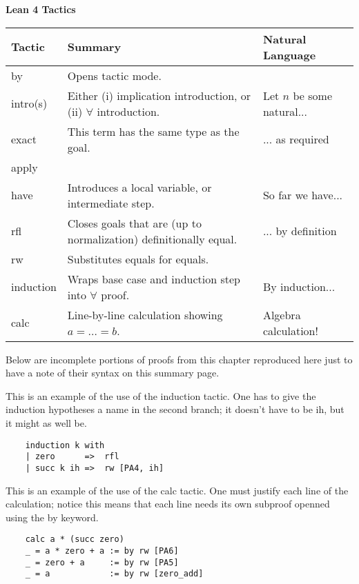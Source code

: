 \documentclass{book}
\begin{document}
\begin{table}[htbp]
    \centering
    \renewcommand{\arraystretch}{1.5}
    \textbf{Lean 4 Tactics}\\
    \vspace{0.2cm}        
    \footnotesize
    \begin{tabular}{|l|l|l|}
    \hline
    \textbf{Tactic} & \textbf{Summary} & \textbf{Natural Language} \\
    \hline
    by & Opens tactic mode. & \\
    intro(s) & Either (i) implication introduction, or (ii) $\forall$ introduction. & Let $n$ be some natural...\\
    exact & This term has the same type as the goal. & ... as required \\
    apply & & \\
    have & Introduces a local variable, or intermediate step. & So far we have... \\
    rfl & Closes goals that are (up to normalization) definitionally equal. & ... by definition \\
    rw & Substitutes equals for equals. & \\
    induction & Wraps base case and induction step into $\forall$ proof. & By induction...\\
    calc & Line-by-line calculation showing $a = \dots = b$. & Algebra calculation!\\
    \hline
    \end{tabular}
\end{table}

Below are incomplete portions of proofs from this chapter reproduced here just to have a note of their syntax on this summary page. 

This is an example of the use of the induction tactic. One has to give the induction hypotheses a name in the second branch; it doesn't have to be ih, but it might as well be. 
\begin{lstlisting}
    induction k with
    | zero      =>  rfl
    | succ k ih =>  rw [PA4, ih]
\end{lstlisting}
    

This is an example of the use of the calc tactic. One must justify each line of the calculation; notice this means that each line needs its own subproof openned using the by keyword. 
\begin{lstlisting}
    calc a * (succ zero)
    _ = a * zero + a := by rw [PA6]
    _ = zero + a     := by rw [PA5]
    _ = a            := by rw [zero_add]
\end{lstlisting}
\end{document}
